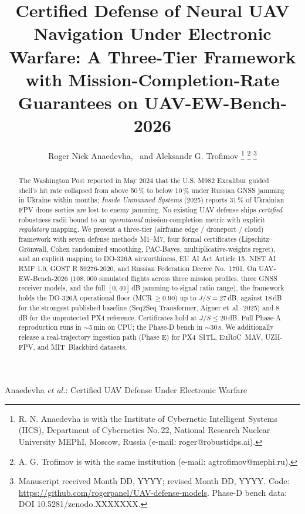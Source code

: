 \documentclass[10pt,journal,compsoc,twoside]{IEEEtran}
\begin{document}
\title{Certified Defense of Neural UAV Navigation Under Electronic
Warfare: A Three-Tier Framework with Mission-Completion-Rate
Guarantees on UAV-EW-Bench-2026}

\author{Roger Nick Anaedevha,~
        and Aleksandr G. Trofimov%
\thanks{R. N. Anaedevha is with the Institute of Cybernetic Intelligent
Systems (IICS), Department of Cybernetics No.\,22, National Research
Nuclear University MEPhI, Moscow, Russia
(e-mail: roger@robustidps.ai).}%
\thanks{A. G. Trofimov is with the same institution
(e-mail: agtrofimov@mephi.ru).}%
\thanks{Manuscript received Month DD, YYYY; revised Month DD, YYYY.
Code: \url{https://github.com/rogerpanel/UAV-defense-models}.
Phase-D bench data: DOI 10.5281/zenodo.XXXXXXX.}}

%
{Anaedevha \MakeLowercase{\textit{et al.}}: Certified UAV Defense
Under Electronic Warfare}


\maketitle

\begin{abstract}
The Washington Post reported in May 2024 that the U.S. M982 Excalibur
guided shell's hit rate collapsed from above 50\,\% to below 10\,\%
under Russian GNSS jamming in Ukraine within months;
\emph{Inside Unmanned Systems} (2025) reports 31\,\% of Ukrainian FPV
drone sorties are lost to enemy jamming. No existing UAV defense
ships \emph{certified} robustness radii bound to an \emph{operational}
mission-completion metric with explicit \emph{regulatory} mapping.
We present a three-tier (airframe edge / droneport / cloud) framework
with seven defense methods M1--M7, four formal certificates
(Lipschitz--Gr\"onwall, Cohen randomized smoothing, PAC-Bayes,
multiplicative-weights regret), and an explicit mapping to DO-326A
airworthiness, EU AI Act Article 15, NIST AI RMF 1.0, GOST R 59276-2020,
and Russian Federation Decree No.~1701. On UAV-EW-Bench-2026
($108{,}000$ simulated flights across three mission profiles, three
GNSS receiver models, and the full $[0,40]$\,dB jamming-to-signal
ratio range), the framework holds the DO-326A operational floor
(MCR\,$\geq\!0.90$) up to $J/S{=}27$\,dB, against $18$\,dB for the
strongest published baseline (Seq2Seq Transformer, Aigner et~al.\
2025) and $8$\,dB for the unprotected PX4 reference. Certificates
hold at $J/S \le 20$\,dB. Full Phase-A reproduction runs in
$\sim$5\,min on CPU; the Phase-D bench in $\sim$30\,s. We additionally
release a real-trajectory ingestion path (Phase E) for PX4~SITL,
EuRoC~MAV, UZH-FPV, and MIT~Blackbird datasets.
\end{abstract}
\end{document}
